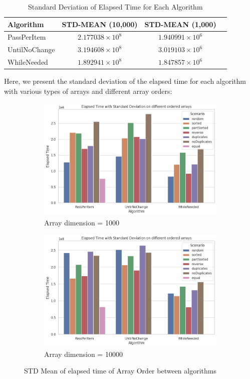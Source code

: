 \documentclass{article}
\begin{document}
\begin{table}[h]
  \centering
  \caption{Standard Deviation of Elapsed Time for Each Algorithm}
  \begin{tabular}{lccc}
    \toprule
    Algorithm & STD-MEAN (10,000) & STD-MEAN (1,000) \\
    \midrule
    PassPerItem & $2.177038 \times 10^8$ & $1.940991 \times 10^6$ \\
    UntilNoChange & $3.194608 \times 10^8$ & $3.019103 \times 10^6$ \\
    WhileNeeded & $1.892941 \times 10^8$ & $1.847857 \times 10^6$ \\
    \bottomrule
  \end{tabular}
\end{table}
Here, we present the standard deviation of the elapsed time for each algorithm with various types of arrays and different array orders:\\
\begin{figure}[H]
  \centering
  \begin{subfigure}[b]{0.48\textwidth}
      \centering
      \includegraphics[width=\textwidth]{./data/std_order_array_1000.png}
      \caption{Array dimension = 1000}
  \end{subfigure}
  \hfill
  \begin{subfigure}[b]{0.48\textwidth}
      \centering
      \includegraphics[width=\textwidth]{./data/std_order_array_10000.png}
      \caption{Array dimension = 10000}
  \end{subfigure}
  \caption{STD Mean of elapsed time of Array Order between algorithms}
\end{figure}
\end{document}
